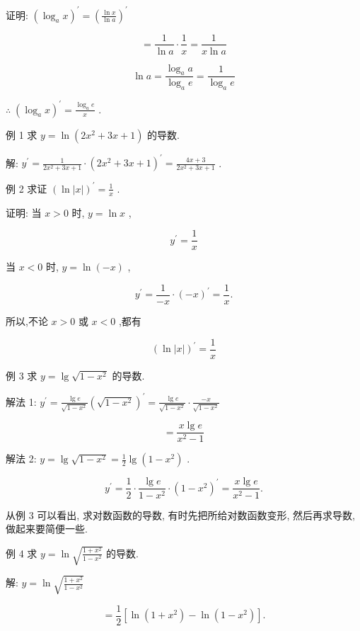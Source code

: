 \documentclass[lang=cn,newtx,12pt,scheme=chinese]{elegantbook}
\begin{document}
证明: \({\left( {\log }_{a}x\right) }^{\prime } = {\left( \frac{\ln x}{\ln a}\right) }^{\prime }\)

\[
= \frac{1}{\ln a} \cdot \frac{1}{x} = \frac{1}{x\ln a}
\]

\[
\ln a = \frac{{\log }_{a}a}{{\log }_{a}e} = \frac{1}{{\log }_{a}e}
\]

\(\therefore \;{\left( {\log }_{a}x\right) }^{\prime } = \frac{{\log }_{a}e}{x}\) .

例 1 求 \(y = \ln \left( {2{x}^{2} + {3x} + 1}\right)\) 的导数.

解: \({y}^{\prime } = \frac{1}{2{x}^{2} + {3x} + 1} \cdot {\left( 2{x}^{2} + 3x + 1\right) }^{\prime } = \frac{{4x} + 3}{2{x}^{2} + {3x} + 1}\) .

例 2 求证 \({\left( \ln \left| x\right| \right) }^{\prime } = \frac{1}{x}\) .

证明: 当 \(x > 0\) 时, \(y = \ln x\) ,

\[
{y}^{\prime } = \frac{1}{x}
\]

当 \(x < 0\) 时, \(y = \ln \left( {-x}\right)\) ,

\[
{y}^{\prime } = \frac{1}{-x} \cdot {\left( -x\right) }^{\prime } = \frac{1}{x}.
\]

所以,不论 \(x > 0\) 或 \(x < 0\) ,都有

\[
{\left( \ln \left| x\right| \right) }^{\prime } = \frac{1}{x}
\]

例 3 求 \(y = \lg \sqrt{1 - {x}^{2}}\) 的导数.

解法 1: \({y}^{\prime } = \frac{\lg e}{\sqrt{1 - {x}^{2}}}{\left( \sqrt{1 - {x}^{2}}\right) }^{\prime } = \frac{\lg e}{\sqrt{1 - {x}^{2}}} \cdot \frac{-x}{\sqrt{1 - {x}^{2}}}\)

\[
= \frac{x\lg e}{{x}^{2} - 1}
\]

解法 2: \(y = \lg \sqrt{1 - {x}^{2}} = \frac{1}{2}\lg \left( {1 - {x}^{2}}\right)\) .

\[
{y}^{\prime } = \frac{1}{2} \cdot \frac{\lg e}{1 - {x}^{2}} \cdot {\left( 1 - {x}^{2}\right) }^{\prime } = \frac{x\lg e}{{x}^{2} - 1}.
\]

从例 3 可以看出, 求对数函数的导数, 有时先把所给对数函数变形, 然后再求导数, 做起来要简便一些.

例 4 求 \(y = \ln \sqrt{\frac{1 + {x}^{2}}{1 - {x}^{2}}}\) 的导数.

解: \(y = \ln \sqrt{\frac{1 + {x}^{2}}{1 - {x}^{2}}}\)

\[
= \frac{1}{2}\left\lbrack {\ln \left( {1 + {x}^{2}}\right) - \ln \left( {1 - {x}^{2}}\right) }\right\rbrack \text{.}
\]
\end{document}
